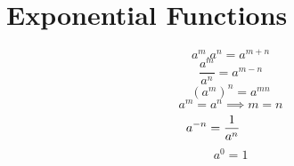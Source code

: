 \section{Exponential Functions}
\begin{equation}
\label{amn}
a^m . a^n  = a^{m+n}
\end{equation}
\begin{equation}
\label{am/n}
\frac{a^m}{a^n}  = a^{m-n}
\end{equation}
\begin{equation}
\label{a^mn}
({a^m})^{n} = a^{mn}
\end{equation}
\begin{equation}
\label{am_equal_an}
a^m = a^n \implies m = n
\end{equation}
\begin{equation}
\label{atominusn}
a^{-n} = \frac{1}{a^n} \hspace{10mm} 
\end{equation}
\begin{equation}
\label{ato0}
a^{0} = 1
\end{equation}


